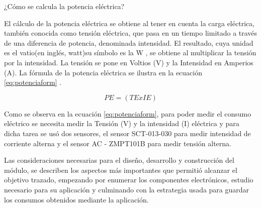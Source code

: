 \vspace{0.2cm}
¿Cómo se calcula la potencia eléctrica?

El cálculo de la potencia eléctrica se obtiene al tener en cuenta la carga eléctrica, también conocida como tensión eléctrica, que pasa en un tiempo limitado a través de una diferencia de potencia, denominada intensidad. El resultado, cuya unidad es el vatio(en inglés, watt)su símbolo es la W , se obtiene al multiplicar la tensión por la intensidad. La tensión se pone en Voltios (V) y la Intensidad en Amperios (A). La fórmula de la potencia eléctrica se ilustra en la ecuación \ref{eq:potenciaform} \citep{WEBSITE:20}.

\begin{equation}
	\label{eq:potenciaform}
	PE = \left( TE x IE \right)
\end{equation}

Como se observa en la ecuación \ref{eq:potenciaform}, para poder medir el consumo eléctrico se necesita medir la Tensión (V) y la intensidad (I) eléctrica y para dicha tarea se usó dos sensores, el sensor SCT-013-030 para medir intensidad de corriente alterna y el sensor AC - ZMPT101B para medir tensión alterna.

Las consideraciones necesarias para el diseño, desarrollo y construcción del módulo, se describen los aspectos más importantes que permitió alcanzar el objetivo trazado, empezando por enumerar los componentes electrónicos, estudio necesario para su aplicación y culminando con la estrategia usada para guardar los consumos obtenidos mediante la aplicación.


